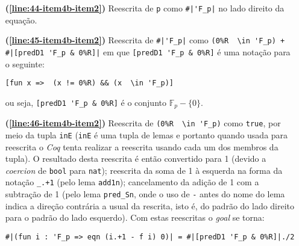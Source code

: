 \begin{enumerate}[label=\textbf{\roman*.}]
\begin{enumerate}[label=\textbf{\roman{enumi}.(\alph*)}]
\begin{enumerate}[label=\textbf{(\alph{enumii}.\arabic*)}]
\begin{enumerate}[listparindent=\parindent]
                                        \begin{lstlisting}[language=coq,frame=single,tabsize=1]
#|(fun i : 'F_p => eqn (i.+1 - f i) 0)| = p.-1./2
                                        \end{lstlisting}

                                \item[\textbf{(\ref{line:44-item4b-item2})}] Reescrita de \lstinline[language=coq]|p| como \lstinline[language=coq]!#|'F_p|! no lado direito da equação.
                                
                                \item[\textbf{(\ref{line:45-item4b-item2})}] Reescrita de \lstinline[language=coq]!#|'F_p|! como \lstinline[language=coq]!(0%R  \in 'F_p) + #|[predD1 'F_p & 0%R]|! em que \lstinline[language=coq]![predD1 'F_p & 0%R]! é uma notação para o seguinte:
                                
                                        \begin{lstlisting}[language=coq,frame=single,tabsize=1]
[fun x =>  (x != 0%R) && (x  \in 'F_p)]
                                        \end{lstlisting}
                                ou seja, \lstinline[language=coq]![predD1 'F_p & 0%R]! é o conjunto $\mathbb{F}_p - \{0\}$.

                                \item[\textbf{(\ref{line:46-item4b-item2})}] Reescrita de \lstinline[language=coq]!(0%R  \in 'F_p)! como \lstinline[language=coq]!true!, por meio da tupla \lstinline[language=coq]!inE! (\lstinline[language=coq]!inE! é uma tupla de lemas e portanto quando usada para reescrita o \textit{Coq} tenta realizar a reescrita usando cada um dos membros da tupla). O resultado desta reescrita é então convertido para 1 (devido a \textit{coercion} de \lstinline[language=coq]!bool! para \lstinline[language=coq]!nat!); reescrita da soma de 1 à esquerda na forma da notação \lstinline[language=coq]!_.+1! (pelo lema \lstinline[language=coq]!add1n!); cancelamento da adição de 1 com a subtração de 1 (pelo lema \lstinline[language=coq]!pred_Sn!, onde o uso de \lstinline[language=coq]|-| antes do nome do lema indica a direção contrária a usual da rescrita, isto é, do padrão do lado direito para o padrão do lado esquerdo). Com estas reescritas o \textit{goal} se torna:
                                        \begin{lstlisting}[language=coq,frame=single,tabsize=1]
#|(fun i : 'F_p => eqn (i.+1 - f i) 0)| = #|[predD1 'F_p & 0%R]|./2
                                        \end{lstlisting}
                                

\end{enumerate}
\end{enumerate}
\end{enumerate}
\end{enumerate}
